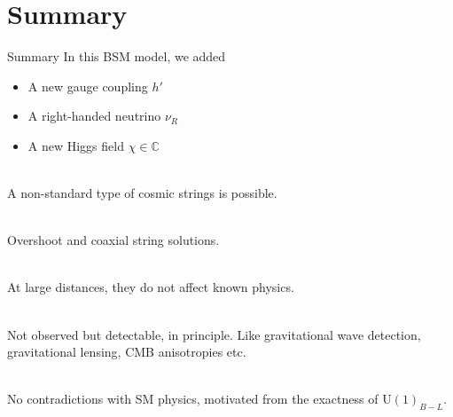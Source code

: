 \documentclass[14pt]{beamer}
\begin{document}
\section{Summary}
\begin{frame}{Summary}
In this BSM model, we added
\begin{itemize}
	\item A new gauge coupling $h'$ 
	\item A right-handed neutrino $\nu_R$
	\item A new Higgs field $\chi\in\mathbb{C}$ \\~\

\end{itemize}

A non-standard type of cosmic strings is possible.\\~\

Overshoot and coaxial string solutions. \\~\
 
At large distances, they do not affect known physics.\\~\


\end{frame}
 
\begin{frame}


Not observed but detectable, in principle. Like gravitational wave detection, gravitational lensing, CMB anisotropies etc. \\~\

No contradictions with SM physics, motivated from the exactness of U$(1)_{B-L}$.
\end{frame}
\end{document}
